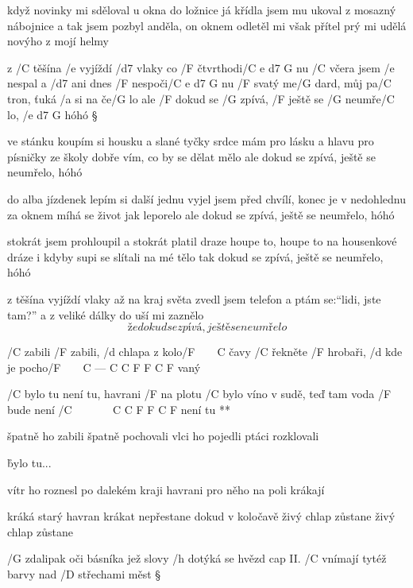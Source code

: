 když novinky mi sděloval u okna do ložnice
já křídla jsem mu ukoval z mosazný nábojnice
a tak jsem pozbyl anděla, on oknem odletěl mi
však přítel prý mi udělá novýho z mojí helmy

\rr




z /C těšína /e vyjíždí /d7 vlaky co /F čtvrthodi/{C e d7 G} nu
/C včera jsem /e nespal a /d7 ani dnes /F nespoči/{C e d7 G} nu
/F svatý me/G dard, můj pa/C tron, ťuká /a si na če/G lo
ale /F dokud se /G zpívá, /F ještě se /G neumře/C lo, /{e d7 G} hóhó \S

ve stánku koupím si housku a slané tyčky
srdce mám pro lásku a hlavu pro písničky
ze školy dobře vím, co by se dělat mělo
ale dokud se zpívá, ještě se neumřelo, hóhó \s

do alba jízdenek lepím si další jednu
vyjel jsem před chvílí, konec je v nedohlednu
za oknem míhá se život jak leporelo
ale dokud se zpívá, ještě se neumřelo, hóhó \s

stokrát jsem prohloupil a stokrát platil draze
houpe to, houpe to na housenkové dráze
i kdyby supi se slítali na mé tělo
tak dokud se zpívá, ještě se neumřelo, hóhó \s

z těšína vyjíždí vlaky až na kraj světa
zvedl jsem telefon a ptám se:``lidi, jste tam?''
a z veliké dálky do uší mi zaznělo
\[ že dokud se zpívá, ještě se neumřelo \]




/C zabili /F zabili, /d chlapa z kolo/{F~~~~C} čavy
/C řekněte /F hrobaři, /d kde je pocho/{F~~~~C --- C C F F C F} vaný

\R  /C bylo tu není tu, havrani /F na plotu
    /C bylo víno v sudě, teď tam voda /F bude
    není /{C ~~~~~~ C C F F C F} není tu **

špatně ho zabili špatně pochovali
vlci ho pojedli ptáci rozklovali

\r bylo tu...

vítr ho roznesl po dalekém kraji
havrani pro něho na poli krákají

\rr

kráká starý havran krákat nepřestane
dokud v koločavě živý chlap zůstane
živý chlap zůstane




/G zdalipak oči básníka jež slovy /h dotýká se hvězd \hfill cap II.
/C vnímají tytéž barvy nad /D střechami měst \S

